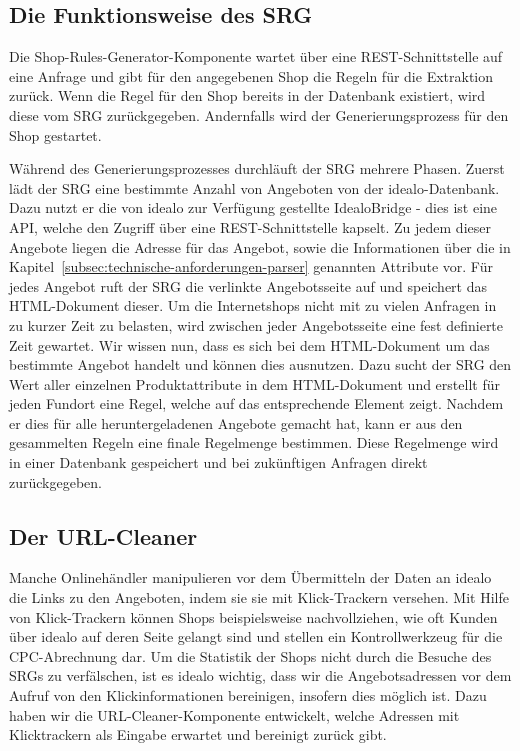 \subsection{Die Funktionsweise des SRG}
\label{subsec:funktionsweise-srg}

Die Shop-Rules-Generator-Komponente wartet über eine REST-Schnittstelle auf eine Anfrage und gibt für den angegebenen
Shop die Regeln für die Extraktion zurück.
Wenn die Regel für den Shop bereits in der Datenbank existiert, wird diese vom SRG zurückgegeben.
Andernfalls wird der Generierungsprozess für den Shop gestartet.

Während des Generierungsprozesses durchläuft der SRG mehrere Phasen.
Zuerst lädt der SRG eine bestimmte Anzahl von Angeboten von der idealo-Datenbank.
Dazu nutzt er die von idealo zur Verfügung gestellte IdealoBridge - dies ist eine API, welche den Zugriff über
eine REST-Schnittstelle kapselt.
Zu jedem dieser Angebote liegen die Adresse für das Angebot, sowie die  Informationen über die in
Kapitel~\ref{subsec:technische-anforderungen-parser} genannten Attribute vor.
Für jedes Angebot ruft der SRG die verlinkte Angebotsseite auf und speichert das HTML-Dokument dieser.
Um die Internetshops nicht mit zu vielen Anfragen in zu kurzer Zeit zu belasten, wird zwischen jeder Angebotsseite
eine fest definierte Zeit gewartet.
Wir wissen nun, dass es sich bei dem HTML-Dokument um das bestimmte Angebot handelt und können dies ausnutzen.
Dazu sucht der SRG den Wert aller einzelnen Produktattribute in dem HTML-Dokument und erstellt für jeden Fundort eine
Regel, welche auf das entsprechende Element zeigt.
Nachdem er dies für alle heruntergeladenen Angebote gemacht hat, kann er aus den gesammelten Regeln eine
finale Regelmenge bestimmen.
Diese Regelmenge wird in einer Datenbank gespeichert und bei zukünftigen Anfragen direkt zurückgegeben.

\subsection{Der URL-Cleaner}
\label{subsec:urlcleaner}

Manche Onlinehändler manipulieren vor dem Übermitteln der Daten an idealo die Links zu den Angeboten, indem sie sie
mit Klick-Trackern versehen.
Mit Hilfe von Klick-Trackern können Shops beispielsweise nachvollziehen, wie oft Kunden über idealo auf deren Seite
gelangt sind und stellen ein Kontrollwerkzeug für die CPC-Abrechnung dar.
Um die Statistik der Shops nicht durch die Besuche des SRGs zu verfälschen, ist es idealo wichtig, dass wir die
Angebotsadressen vor dem Aufruf von den Klickinformationen bereinigen, insofern dies möglich ist.
Dazu haben wir die URL-Cleaner-Komponente entwickelt, welche Adressen mit Klicktrackern als Eingabe erwartet und
bereinigt zurück gibt.

